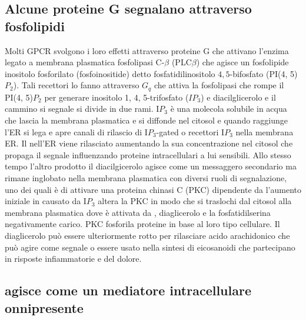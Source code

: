 \subsection{Alcune proteine G segnalano attraverso fosfolipidi}
Molti GPCR svolgono i loro effetti attraverso proteine G che attivano l'enzima legato a membrana plasmatica fosfolipasi C-$\beta$ (PLC$\beta$) che agisce un fosfolipide inositolo 
fosforilato (fosfoinositide) detto fosfatidilinositolo $4,5$-bifosfato (PI(4, 5)$P_2$). Tali recettori lo fanno attraverso $G_q$ che attiva la fosfolipasi che rompe il PI(4, 5)$P_2$
per generare inositolo 1, 4, 5-trifosfato ($IP_3$) e diacilglicerolo e il cammino si segnale si divide in due rami. I$P_3$ \`e una molecola solubile in acqua che lascia la membrana
plasmatica e si diffonde nel citosol e quando raggiunge l'ER si lega e apre canali di rilascio di  I$P_3$-gated o recettori I$P_3$ nella membrana ER. Il  nell'ER
viene rilasciato aumentando la sua concentrazione nel citosol che propaga il segnale influenzando proteine intracellulari a lui sensibili. Allo stesso tempo l'altro prodotto il 
diacilgicerolo agisce come un messaggero secondario ma rimane inglobato nella membrana plasmatica con diversi ruoli di segnalazione, uno dei quali \`e di attivare una proteina chinasi
C (PKC) dipendente da  l'aumento iniziale in  causato da I$P_3$ altera la PKC in modo che si traslochi dal citosol alla membrana plasmatica dove \`e attivata da
, diaglicerolo e la fosfatidilserina negativamente carico. PKC fosforila proteine in base al loro tipo cellulare. Il diaglicerolo pu\`o essere ulteriormente rotto 
per rilasciare acido arachidonico che pu\`o agire come segnale o essere usato nella sintesi di eicosanoidi che partecipano in risposte infiammatorie e del dolore. 
\subsection{ agisce come un mediatore intracellulare onnipresente}


